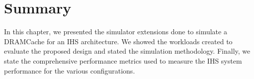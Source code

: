 \section{Summary}
In this chapter, we presented the simulator extensions done to simulate a DRAMCache for an IHS architecture. We showed the workloads created to evaluate the proposed design and stated the simulation methodology. Finally, we state the comprehensive performance metrics used to measure the IHS system performance for the various configurations.

